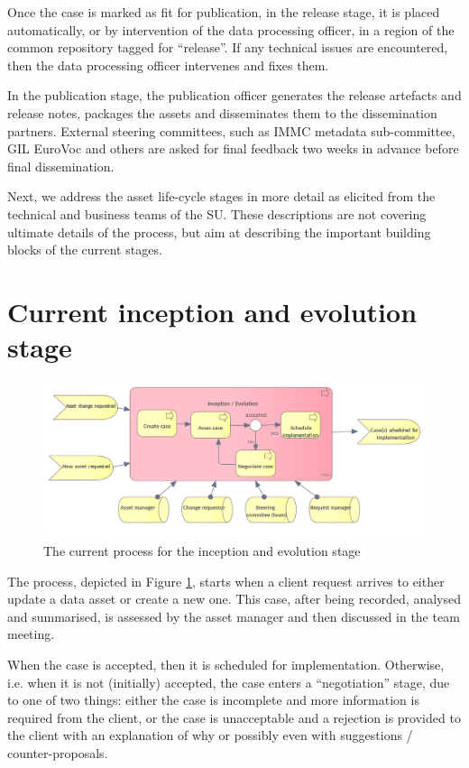 	Once the case is marked as fit for publication, in the release stage, it is placed automatically, or by intervention of the data processing officer, in a region of the common repository tagged for ``release''. If any technical issues are encountered, then the data processing officer intervenes and fixes them.
	
	In the publication stage, the publication officer generates the release artefacts and release notes, packages the assets and disseminates them to the dissemination partners. External steering committees, such as IMMC metadata sub-committee, GIL EuroVoc and others are asked for final feedback two weeks in advance before final dissemination.
	
	Next, we address the asset life-cycle stages in more detail as elicited from the technical and business teams of the SU. These descriptions are not covering ultimate details of the process, but aim at describing the important building blocks of the current stages. 
	
	\section{Current inception and evolution stage}
	\label{sec:inception-current}
	
	\begin{figure}[h]
		\centering
		\includegraphics[width=.8\textwidth]{images/business/current/InceptionEvolution.png}
		\caption{The current process for the inception and evolution stage}
		\label{fig:evolution-current}
	\end{figure}		
	
	The process, depicted in Figure \ref{fig:evolution-current}, starts when a client request arrives to either update a data asset or create a new one. This case, after being recorded, analysed and summarised, is assessed by the asset manager and then discussed in the team meeting. 
	
	
	When the case is accepted, then it is scheduled for implementation. Otherwise, i.e. when it is not (initially) accepted, the case enters a ``negotiation'' stage, due to one of two things: either the case is incomplete and more information is required from the client, or the case is unacceptable and a rejection is provided to the client with an explanation of why or possibly even with suggestions / counter-proposals. 
	

